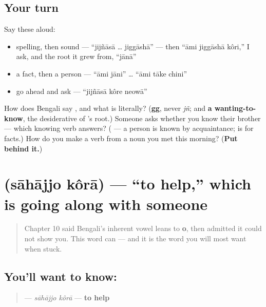\subsection*{Your turn}
Say these aloud:

\begin{itemize}
\raggedright
  \item spelling, then sound — \textquotedblleft{}jijñāsā … jiggāshā\textquotedblright{} — then \textquotedblleft{}āmi jiggāshā kôri,\textquotedblright{} I ask, and the root it grew from, \textquotedblleft{}jānā\textquotedblright{}
  \item a fact, then a person — \textquotedblleft{}āmi jāni\textquotedblright{} … \textquotedblleft{}āmi tāke chini\textquotedblright{}
  \item go ahead and ask — \textquotedblleft{}jijñāsā kôre neowā\textquotedblright{}
\end{itemize}

\begin{tcolorbox}[breakable,colback=teal!4,colframe=teal!35!black,title={Before you move on}]
How does Bengali say \textbf{}, and what is  literally? (\textbf{gg}, never \emph{jñ}; and \textbf{a wanting-to-know}, the desiderative of 's root.) Someone asks whether you know their brother — which knowing verb answers? (\textbf{} — a person is known by acquaintance;  is for facts.) How do you make a verb from a noun you met this morning? (\textbf{Put  behind it.})
\end{tcolorbox}
\section[sāhājjo kôrā]{  (sāhājjo kôrā) — \textquotedblleft{}to help,\textquotedblright{} which is going along with someone}

\label{lesson:BN-C09-sahajjo-kora}



\begin{quote}
Chapter 10 said Bengali's inherent vowel leans to \textbf{o}, then admitted it could not show you. This word can — and it is the word you will most want when stuck.
\end{quote}

\subsection*{You'll want to know:  }
\begin{quote}
\textbf{ } — \emph{sāhājjo kôrā} — \textbf{to help}
\end{quote}

